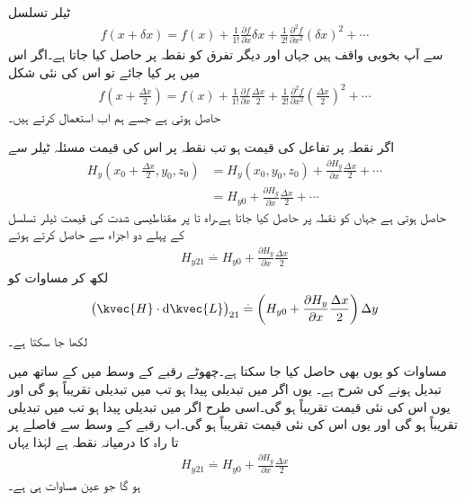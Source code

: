 ٹیلر تسلسل
\begin{align*}
f(x+\delta x)=f(x)+\frac{1}{1!}\frac{\partial f}{\partial x} \delta x + \frac{1}{2!}\frac{\partial^2 f}{\partial x^2} (\delta x)^2+\cdots
\end{align*}
سے آپ بخوبی واقف ہیں جہاں  اور دیگر تفرق کو نقطہ  پر حاصل کیا جاتا ہے۔اگر اس میں  پر کیا جائے تو اس کی نئی شکل
\begin{align*}
f(x+\tfrac{\Delta x}{2})=f(x)+\frac{1}{1!}\frac{\partial f}{\partial x} \frac{\Delta x}{2} + \frac{1}{2!}\frac{\partial^2 f}{\partial x^2} \left(\frac{\Delta x}{2}\right)^2+\cdots
\end{align*}
حاصل ہوتی ہے جسے ہم اب استعمال کرتے ہیں۔


اگر نقطہ  پر تفاعل  کی قیمت  ہو تب نقطہ  پر اس کی قیمت مسئلہ ٹیلر سے 
\begin{align*}
H_y(x_0+\tfrac{\Delta x}{2},y_0,z_0)&=H_y(x_0,y_0,z_0)+\frac{\partial H_y}{\partial x} \frac{\Delta x}{2}+\cdots\\
&=H_{y0}+\frac{\partial H_y}{\partial x} \frac{\Delta x}{2}+\cdots
\end{align*}
حاصل ہوتی ہے جہاں  کو نقطہ  پر حاصل کیا جاتا ہے۔راہ  تا  پر مقناطیسی شدت کی قیمت ٹیلر تسلسل کے پہلے دو اجزاء سے حاصل کرتے ہوئے
\begin{align}\label{مساوات_مقناطیسی_راہ_پہلے_حصے_پر_شدت}
H_{y21} \overset{.}{=}H_{y0}+\frac{\partial H_y}{\partial x} \frac{\Delta x}{2}
\end{align}
لکھ کر مساوات  کو
\begin{align}\label{مساوات_مقناطیسی_پہلے_حصہ_تکمل_الف}
\left( \kvec{H} \cdot \dif \kvec{L}\right)_{21}\overset{.}{=}\left(H_{y0}+\frac{\partial H_y}{\partial x} \frac{\Delta x}{2} \right)\Delta y 
\end{align}
لکھا جا سکتا ہے۔

مساوات  کو یوں بھی حاصل کیا جا سکتا ہے۔چھوٹے رقبے کے وسط میں  کے ساتھ  میں تبدیل ہونے کی شرح  ہے۔ یوں اگر  میں  تبدیلی پیدا ہو تب   میں تبدیلی تقریباً 
  ہو گی اور یوں اس کی نئی قیمت تقریباً  ہو گی۔اسی طرح اگر  میں  تبدیلی پیدا ہو تب   میں تبدیلی تقریباً  ہو گی اور یوں اس کی نئی قیمت تقریباً  ہو گی۔اب رقبے کے وسط سے   فاصلے پر   تا  راہ کا درمیانہ نقطہ ہے لہٰذا یہاں
\begin{align}\label{مساوات_مقناطیسی_راہ_پہلے_حصے_پر_شدت_دوبارہ}
H_{y21}\overset{.}{=}H_{y0}+\frac{\partial H_y}{\partial x}\frac{\Delta x}{2}
\end{align}
ہو گا جو عین مساوات  ہی  ہے۔

